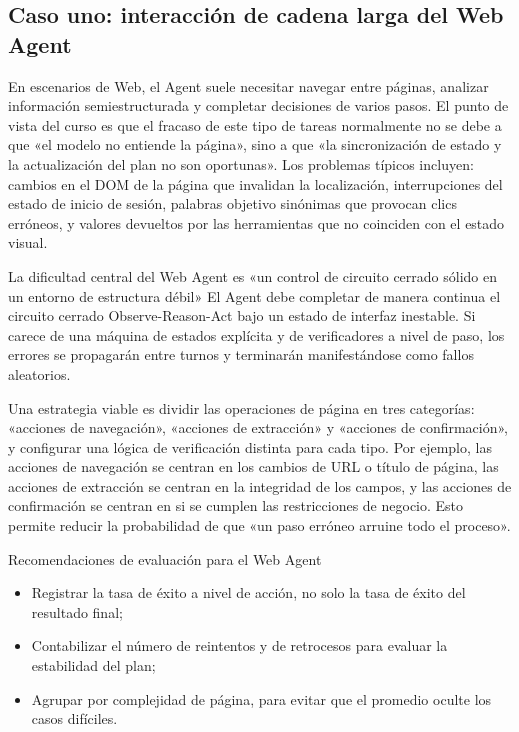 \documentclass[a4paper]{article}
\begin{document}
\subsection{Caso uno: interacción de cadena larga del Web Agent}
En escenarios de Web, el Agent suele necesitar navegar entre páginas, analizar información semiestructurada y completar decisiones de varios pasos. El punto de vista del curso es que el fracaso de este tipo de tareas normalmente no se debe a que «el modelo no entiende la página», sino a que «la sincronización de estado y la actualización del plan no son oportunas». Los problemas típicos incluyen: cambios en el DOM de la página que invalidan la localización, interrupciones del estado de inicio de sesión, palabras objetivo sinónimas que provocan clics erróneos, y valores devueltos por las herramientas que no coinciden con el estado visual.

\begin{importantbox}{La dificultad central del Web Agent es «un control de circuito cerrado sólido en un entorno de estructura débil»}
El Agent debe completar de manera continua el circuito cerrado Observe-Reason-Act bajo un estado de interfaz inestable. Si carece de una máquina de estados explícita y de verificadores a nivel de paso, los errores se propagarán entre turnos y terminarán manifestándose como fallos aleatorios.
\end{importantbox}

Una estrategia viable es dividir las operaciones de página en tres categorías: «acciones de navegación», «acciones de extracción» y «acciones de confirmación», y configurar una lógica de verificación distinta para cada tipo. Por ejemplo, las acciones de navegación se centran en los cambios de URL o título de página, las acciones de extracción se centran en la integridad de los campos, y las acciones de confirmación se centran en si se cumplen las restricciones de negocio. Esto permite reducir la probabilidad de que «un paso erróneo arruine todo el proceso».

\begin{knowledgebox}{Recomendaciones de evaluación para el Web Agent}
\begin{itemize}
    \item Registrar la tasa de éxito a nivel de acción, no solo la tasa de éxito del resultado final;
    \item Contabilizar el número de reintentos y de retrocesos para evaluar la estabilidad del plan;
    \item Agrupar por complejidad de página, para evitar que el promedio oculte los casos difíciles.
\end{itemize}
\end{knowledgebox}
\end{document}
